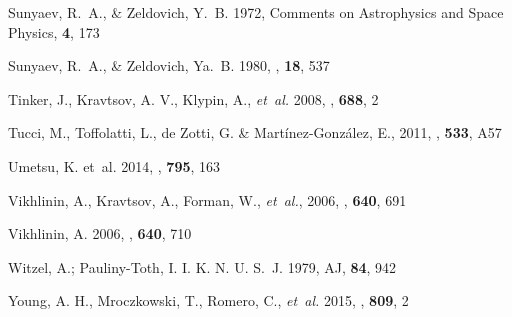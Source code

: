 \documentclass[traditabstract]{aa}
\begin{document}
\begin{thebibliography}{81}
Sunyaev, R.~A., \& Zeldovich, Y.~B. 1972, Comments on Astrophysics and Space
  Physics, \textbf{4}, 173
  
Sunyaev, R.~A., \& Zeldovich, {\relax Ya}.~B. 1980, \araa, \textbf{18}, 537

{Tinker}, J., {Kravtsov}, A. V., {Klypin}, A., \emph{et~al.} 2008, \apj, \textbf{688}, 2

Tucci, M., Toffolatti, L., de Zotti, G. \& Mart\'inez-Gonz\'alez, E., 2011, \aap, \textbf{533}, A57

{Umetsu}, K. {et~al.} 2014, \apj, \textbf{795}, 163

Vikhlinin, A., Kravtsov, A., Forman, W., \emph{et~al.}, 2006{}, \apj, \textbf{640}, 691

Vikhlinin, A. 2006{}, \apj, \textbf{640}, 710

Witzel, A.; Pauliny-Toth, I. I. K. N. U. S.~J. 1979, AJ, \textbf{84}, 942

{Young}, A. H., {Mroczkowski}, T., {Romero}, C., \emph{et~al.} 2015, \apj, \textbf{809}, 2

\end{thebibliography}
\end{document}
